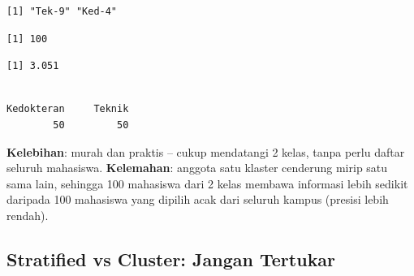 \documentclass[
  indonesian,
  letterpaper,
]{book}
\newenvironment{Shaded}{\begin{snugshade}}{\end{snugshade}}
\newcommand{\FunctionTok}[1]{\textcolor[rgb]{0.28,0.35,0.67}{#1}}
\newcommand{\NormalTok}[1]{\textcolor[rgb]{0.00,0.23,0.31}{#1}}
\newcommand{\OtherTok}[1]{\textcolor[rgb]{0.00,0.23,0.31}{#1}}
\newcommand{\SpecialCharTok}[1]{\textcolor[rgb]{0.37,0.37,0.37}{#1}}
\begin{document}
\begin{verbatim}
[1] "Tek-9" "Ked-4"
\end{verbatim}

\begin{Shaded}
\end{Shaded}

\begin{verbatim}
[1] 100
\end{verbatim}

\begin{Shaded}
\end{Shaded}

\begin{verbatim}
[1] 3.051
\end{verbatim}

\begin{Shaded}
\end{Shaded}

\begin{verbatim}

Kedokteran     Teknik 
        50         50 
\end{verbatim}

\textbf{Kelebihan}: murah dan praktis -- cukup mendatangi 2 kelas, tanpa
perlu daftar seluruh mahasiswa. \textbf{Kelemahan}: anggota satu klaster
cenderung mirip satu sama lain, sehingga 100 mahasiswa dari 2 kelas
membawa informasi lebih sedikit daripada 100 mahasiswa yang dipilih acak
dari seluruh kampus (presisi lebih rendah).

\subsection{Stratified vs Cluster: Jangan
Tertukar}\label{stratified-vs-cluster-jangan-tertukar}
\end{document}
